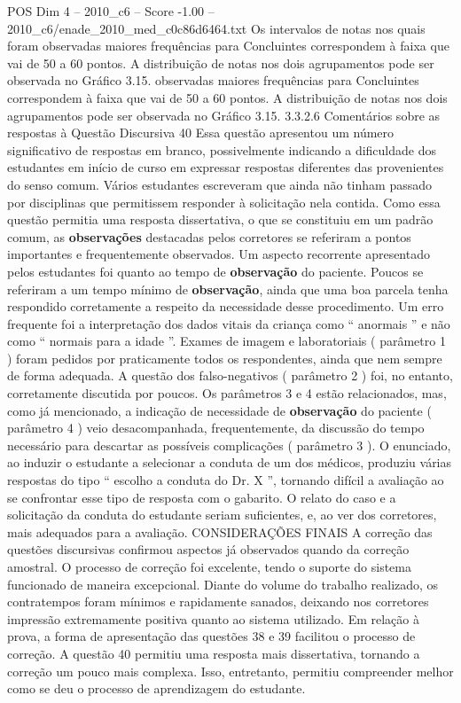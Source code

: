 \begin{textsample}{POS Dim 4 – 2010\_c6 – Score -1.00 – 2010\_c6/enade\_2010\_med\_c0c86d6464.txt}
Os intervalos de notas nos quais foram observadas maiores frequências para Concluintes correspondem à faixa que vai de 50 a 60 pontos.
A distribuição de notas nos dois agrupamentos pode ser observada no Gráfico 3.15. observadas maiores frequências para Concluintes correspondem à faixa que vai de 50 a 60 pontos.
A distribuição de notas nos dois agrupamentos pode ser observada no Gráfico 3.15. 3.3.2.6 Comentários sobre as respostas à Questão Discursiva 40 Essa questão apresentou um número significativo de respostas em branco, possivelmente indicando a dificuldade dos estudantes em início de curso em expressar respostas diferentes das provenientes do senso comum.
Vários estudantes escreveram que ainda não tinham passado por disciplinas que permitissem responder à solicitação nela contida.
Como essa questão permitia uma resposta dissertativa, o que se constituiu em um padrão comum, as \textbf{observações} destacadas pelos corretores se referiram a pontos importantes e frequentemente observados.
Um aspecto recorrente apresentado pelos estudantes foi quanto ao tempo de \textbf{observação} do paciente.
Poucos se referiram a um tempo mínimo de \textbf{observação}, ainda que uma boa parcela tenha respondido corretamente a respeito da necessidade desse procedimento.
Um erro frequente foi a interpretação dos dados vitais da criança como “ anormais ” e não como “ normais para a idade ”.
Exames de imagem e laboratoriais ( parâmetro 1 ) foram pedidos por praticamente todos os respondentes, ainda que nem sempre de forma adequada.
A questão dos falso-negativos ( parâmetro 2 ) foi, no entanto, corretamente discutida por poucos.
Os parâmetros 3 e 4 estão relacionados, mas, como já mencionado, a indicação de necessidade de \textbf{observação} do paciente ( parâmetro 4 ) veio desacompanhada, frequentemente, da discussão do tempo necessário para descartar as possíveis complicações ( parâmetro 3 ).
O enunciado, ao induzir o estudante a selecionar a conduta de um dos médicos, produziu várias respostas do tipo “ escolho a conduta do Dr.
X ”, tornando difícil a avaliação ao se confrontar esse tipo de resposta com o gabarito.
O relato do caso e a solicitação da conduta do estudante seriam suficientes, e, ao ver dos corretores, mais adequados para a avaliação.
CONSIDERAÇÕES FINAIS A correção das questões discursivas confirmou aspectos já observados quando da correção amostral.
O processo de correção foi excelente, tendo o suporte do sistema funcionado de maneira excepcional.
Diante do volume do trabalho realizado, os contratempos foram mínimos e rapidamente sanados, deixando nos corretores impressão extremamente positiva quanto ao sistema utilizado.
Em relação à prova, a forma de apresentação das questões 38 e 39 facilitou o processo de correção.
A questão 40 permitiu uma resposta mais dissertativa, tornando a correção um pouco mais complexa.
Isso, entretanto, permitiu compreender melhor como se deu o processo de aprendizagem do estudante.

\end{textsample}
